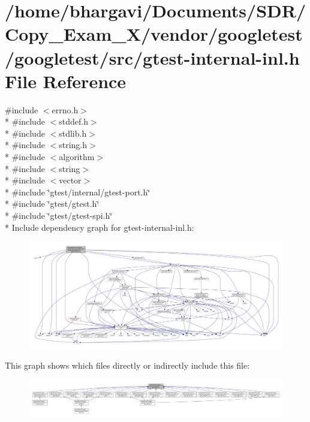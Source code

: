 \hypertarget{gtest-internal-inl_8h}{}\section{/home/bhargavi/\+Documents/\+S\+D\+R/\+Copy\+\_\+\+Exam\+\_\+X/vendor/googletest/googletest/src/gtest-\/internal-\/inl.h File Reference}
\label{gtest-internal-inl_8h}
{\ttfamily \#include $<$errno.\+h$>$}\\*
{\ttfamily \#include $<$stddef.\+h$>$}\\*
{\ttfamily \#include $<$stdlib.\+h$>$}\\*
{\ttfamily \#include $<$string.\+h$>$}\\*
{\ttfamily \#include $<$algorithm$>$}\\*
{\ttfamily \#include $<$string$>$}\\*
{\ttfamily \#include $<$vector$>$}\\*
{\ttfamily \#include \char`\"{}gtest/internal/gtest-\/port.\+h\char`\"{}}\\*
{\ttfamily \#include \char`\"{}gtest/gtest.\+h\char`\"{}}\\*
{\ttfamily \#include \char`\"{}gtest/gtest-\/spi.\+h\char`\"{}}\\*
Include dependency graph for gtest-\/internal-\/inl.h\+:
\nopagebreak
\begin{figure}[H]
\begin{center}
\leavevmode
\includegraphics[width=350pt]{gtest-internal-inl_8h__incl}
\end{center}
\end{figure}
This graph shows which files directly or indirectly include this file\+:
\nopagebreak
\begin{figure}[H]
\begin{center}
\leavevmode
\includegraphics[width=350pt]{gtest-internal-inl_8h__dep__incl}
\end{center}
\end{figure}
